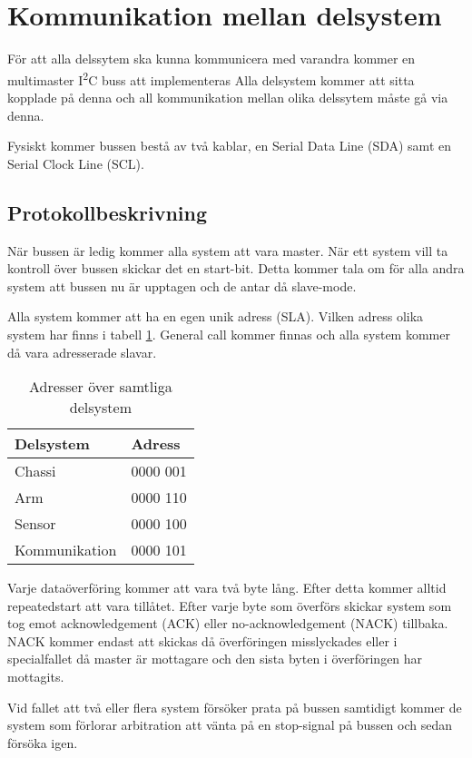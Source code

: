 \section{Kommunikation mellan delsystem}

För att alla delssytem ska kunna kommunicera med varandra kommer en multimaster I\textsuperscript{2}C buss att implementeras Alla delsystem kommer att sitta kopplade på denna och all kommunikation mellan olika delssytem måste gå via denna.

Fysiskt kommer bussen bestå av två kablar, en Serial Data Line (SDA) samt en Serial Clock Line (SCL).

\subsection{Protokollbeskrivning}
När bussen är ledig kommer alla system att vara master. När ett system vill ta kontroll över bussen skickar det en start-bit. Detta kommer tala om för alla andra system att bussen nu är upptagen och de antar då slave-mode.

Alla system kommer att ha en egen unik adress (SLA). Vilken adress olika system har finns i tabell \ref{tab:adresstab}. General call kommer finnas och alla system kommer då vara adresserade slavar.

\begin{table}[h]
\centering
\begin{tabular}{|l|l|}
\hline
\textbf{Delsystem} & \textbf{Adress} \\
\hline
Chassi & 0000 001\\
\hline
Arm & 0000 110\\
\hline
Sensor & 0000 100\\
\hline
Kommunikation & 0000 101\\
\hline
\end{tabular}
\caption{Adresser över samtliga delsystem}
\label{tab:adresstab}
\end{table}

Varje dataöverföring kommer att vara två byte lång. Efter detta kommer alltid repeatedstart att vara tillåtet. Efter varje byte som överförs skickar system som tog emot acknowledgement (ACK) eller no-acknowledgement (NACK) tillbaka. NACK kommer endast att skickas då överföringen misslyckades eller i specialfallet då master är mottagare och den sista byten i överföringen har mottagits.

Vid fallet att två eller flera system försöker prata på bussen samtidigt kommer de system som förlorar arbitration att vänta på en stop-signal på bussen och sedan försöka igen.


